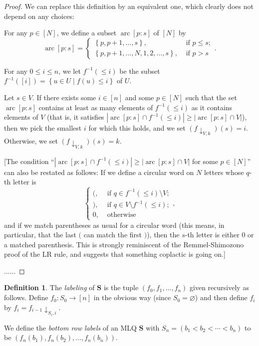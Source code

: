 \documentclass[reqno]{amsart}
\newcommand{\MLQ}{\mathbf{S}}
\newcommand{\set}[1]{\left\{ #1 \right\}}
\newcommand{\abs}[1]{\left| #1 \right|}
\newcommand{\tup}[1]{\left( #1 \right)}
\newcommand{\ive}[1]{\left[ #1 \right]}
\newcommand{\defn}[1]{{\color{darkred}\emph{#1}}} %
\theoremstyle{plain}
\theoremstyle{definition}
\newtheorem{dfn}[thm]{Definition}
\numberwithin{equation}{section}
\begin{document}
\begin{proof}
We can replace this definition by an equivalent one, which
clearly does not depend on any choices:

For any $p \in \ive{N}$, we define a subset
$\operatorname{arc}\ive{p : s}$ of $\ive{N}$ by
\[
\operatorname{arc}\ive{p : s}
=
\begin{cases}
\set{p, p+1, \ldots, s}, & \text{ if } p \leq s; \\
\set{p, p+1, \ldots, N, 1, 2, \ldots, s}, & \text{ if } p > s
\end{cases} .
\]

For any $0 \leq i \leq n$, we let $f^{-1} \tup{\leq i}$ be
the subset
$f^{-1} \tup{\ive{i}} = \set{u \in U \mid f \tup{u} \leq i}$
of $U$.

Let $s \in V$.
If there exists some $i \in \ive{n}$ and some
$p \in \ive{N}$ such that the set
$\operatorname{arc}\ive{p : s}$
contains at least as many elements of $f^{-1} \tup{\leq i}$
as it contains elements of $V$
(that is, it satisfies
$\abs{\operatorname{arc}\ive{p : s} \cap f^{-1} \tup{\leq i}}
\geq \abs{\operatorname{arc}\ive{p : s} \cap V}$),
then we pick the smallest $i$
for which this holds,
and we set $\tup{f \downarrow_{V, k}}\tup{s} = i$.
Otherwise, we set
$\tup{f \downarrow_{V, k}}\tup{s} = k$.

[The condition
``$\abs{\operatorname{arc}\ive{p : s} \cap f^{-1} \tup{\leq i}}
\geq \abs{\operatorname{arc}\ive{p : s} \cap V}$
for some $p \in \ive{N}$''
can also be restated as follows:
If we define a circular word on $N$ letters whose $q$-th letter
is
\[
\begin{cases}
(, & \text{ if } q \in f^{-1} \tup{\leq i} \setminus V; \\
), & \text{ if } q \in V \setminus f^{-1} \tup{\leq i}; \\
0, & \text{ otherwise}
\end{cases}
,
\]
and if we match parentheses as usual for a circular word
(this means, in particular, that the last $($ can match the
first $)$),
then the $s$-th letter is either $0$ or a matched parenthesis.
This is strongly reminiscent of the Remmel-Shimozono proof
of the LR rule, and suggests that something coplactic is
going on.]

......
\end{proof}

\begin{dfn}
The \defn{labeling} of $\MLQ$ is the tuple $(f_0, f_1, \dotsc, f_n)$ given recursively as follows.
Define $f_0 \colon S_0 \to \ive{n}$ in the obvious way (since $S_0 = \varnothing$) and then define $f_i$ by $f_i = f_{i-1} \downarrow_{S_i, i}$.

We define the \defn{bottom row labels} of an MLQ $\MLQ$ with $S_n = (b_1 < b_2 < \cdots < b_n)$ to be $\tup{f_n(b_1), f_n(b_2), \dotsc, f_n(b_n)}$.
\end{dfn}
\end{document}

